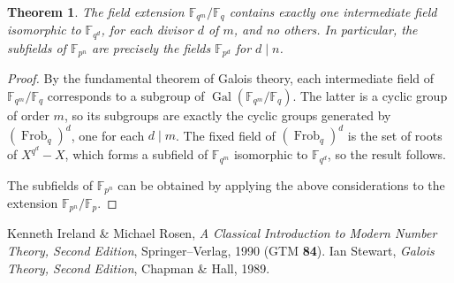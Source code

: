 \documentclass[12pt]{article}
\newcommand{\F}{\mathbb{F}}
\renewcommand{\div}{\mid}
\newcommand{\Frob}{\operatorname{Frob}}
\newcommand{\Gal}{\operatorname{Gal}}
\newtheorem{theorem}{Theorem}[section]
\theoremstyle{definition}
\begin{document}
\begin{theorem}\label{subfields}
The field extension $\F_{q^m}/\F_q$ contains exactly one intermediate
field isomorphic to $\F_{q^d}$, for each divisor $d$ of $m$, and no
others. In particular, the subfields of $\F_{p^n}$ are precisely the
fields $\F_{p^d}$ for $d \div n$.
\end{theorem}
\begin{proof}
By the fundamental theorem of Galois theory, each intermediate field
of $\F_{q^m}/\F_q$ corresponds to a subgroup of
$\Gal(\F_{q^m}/\F_q)$. The latter is a cyclic group of order $m$, so
its subgroups are exactly the cyclic groups generated by
$(\Frob_q)^d$, one for each $d \div m$. The fixed field of
$(\Frob_q)^d$ is the set of roots of $X^{q^d} - X$, which forms a
subfield of $\F_{q^m}$ isomorphic to $\F_{q^d}$, so the result
follows.

The subfields of $\F_{p^n}$ can be obtained by applying the above
considerations to the extension $\F_{p^n}/\F_p$.
\end{proof}


\begin{thebibliography}{9}
 Kenneth Ireland \& Michael Rosen, {\em A Classical
Introduction to Modern Number Theory, Second Edition},
Springer--Verlag, 1990 (GTM {\bf 84}).
 Ian Stewart, {\em Galois Theory, Second Edition},
Chapman \& Hall, 1989.
\end{thebibliography}
\end{document}
